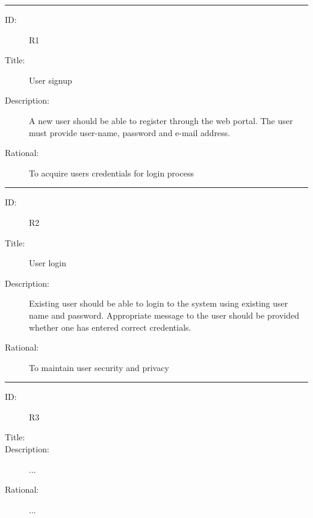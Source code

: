 \hrule
\begin{description}
	\item[ID:] R1
	\item[Title:] User signup
	\item[Description:] A new user should be able to register through the web portal. The user must provide user-name, password and e-mail address.
	\item[Rational:] To acquire users credentials for login process
\end{description}
\hrule
\begin{description}
	\item[ID:] R2
	\item[Title:] User login
	\item[Description:] Existing user should be able to login to the system using existing user name and password. Appropriate message to the user should be provided whether one has entered correct credentials.
	\item[Rational:] To maintain user security and privacy
\end{description}
\hrule
\begin{description}
	\item[ID:] R3
	\item[Title:]
	\item[Description:] ...
	\item[Rational:] ...
\end{description}
